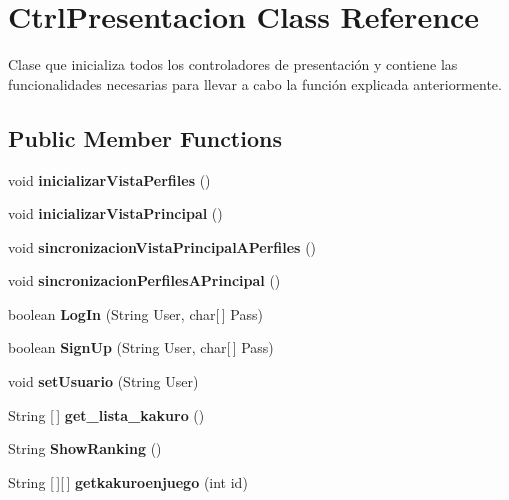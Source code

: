 \section{Ctrl\+Presentacion Class Reference}
\label{class_presentacion_1_1_ctrl_presentacion}


Clase que inicializa todos los controladores de presentación y contiene las funcionalidades necesarias para llevar a cabo la función explicada anteriormente.  


\subsection*{Public Member Functions}
\begin{DoxyCompactItemize}
\item 
\mbox{\label{class_presentacion_1_1_ctrl_presentacion_aa81624e6b6666c72e38209caeed1934a}} 
void {\bfseries inicializar\+Vista\+Perfiles} ()
\item 
\mbox{\label{class_presentacion_1_1_ctrl_presentacion_adf305227754d6bd9739104c70aaebd42}} 
void {\bfseries inicializar\+Vista\+Principal} ()
\item 
\mbox{\label{class_presentacion_1_1_ctrl_presentacion_a296c31ae64da2c2ed1266cacf20cc9ab}} 
void {\bfseries sincronizacion\+Vista\+Principal\+A\+Perfiles} ()
\item 
\mbox{\label{class_presentacion_1_1_ctrl_presentacion_a6c0bd029cb48e550745e589e16a6e820}} 
void {\bfseries sincronizacion\+Perfiles\+A\+Principal} ()
\item 
\mbox{\label{class_presentacion_1_1_ctrl_presentacion_ad57530714d88f506d201d718395cf577}} 
boolean {\bfseries Log\+In} (String User, char[$\,$] Pass)
\item 
\mbox{\label{class_presentacion_1_1_ctrl_presentacion_a8a4e10e8094cac30e3c5536b3a2364ae}} 
boolean {\bfseries Sign\+Up} (String User, char[$\,$] Pass)
\item 
\mbox{\label{class_presentacion_1_1_ctrl_presentacion_a193026f0fe44beaa3a4b311179200d24}} 
void {\bfseries set\+Usuario} (String User)
\item 
\mbox{\label{class_presentacion_1_1_ctrl_presentacion_a45ebd0e10cf0731cbd580006a2b9e365}} 
String [$\,$] {\bfseries get\+\_\+lista\+\_\+kakuro} ()
\item 
\mbox{\label{class_presentacion_1_1_ctrl_presentacion_ab7e52763589137009b637fef9ff3ae5c}} 
String {\bfseries Show\+Ranking} ()
\item 
\mbox{\label{class_presentacion_1_1_ctrl_presentacion_a6a6d6fda88d7f224cac678d508f5c2a2}} 
String [$\,$][$\,$] {\bfseries getkakuroenjuego} (int id)
\end{DoxyCompactItemize}


